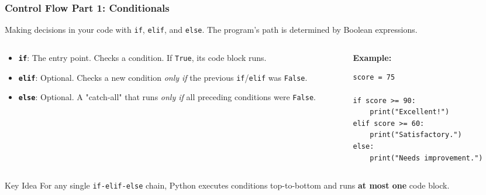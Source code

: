 \documentclass{beamer}
\begin{document}
\begin{frame}[fragile]
    \frametitle{Control Flow Part 1: Conditionals}
    Making decisions in your code with \texttt{if}, \texttt{elif}, and \texttt{else}. The program's path is determined by Boolean expressions.
    \vspace{1em}

    \begin{columns}[T]
        \begin{column}{0.45\textwidth}
            \begin{itemize}
                \item \textbf{\texttt{if}}: The entry point. Checks a condition. If \texttt{True}, its code block runs.
                \vspace{0.5em}
                \item \textbf{\texttt{elif}}: Optional. Checks a new condition \textit{only if} the previous \texttt{if}/\texttt{elif} was \texttt{False}.
                \vspace{0.5em}
                \item \textbf{\texttt{else}}: Optional. A "catch-all" that runs \textit{only if} all preceding conditions were \texttt{False}.
            \end{itemize}
        \end{column}
        
        \begin{column}{0.5\textwidth}
            \textbf{Example:}
            \begin{verbatim}
score = 75

if score >= 90:
    print("Excellent!")
elif score >= 60:
    print("Satisfactory.")
else:
    print("Needs improvement.")
            \end{verbatim}
        \end{column}
    \end{columns}

    \begin{block}{Key Idea}
        For any single \texttt{if-elif-else} chain, Python executes conditions top-to-bottom and runs \textbf{at most one} code block.
    \end{block}
\end{frame}
\end{document}

